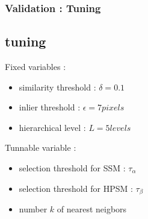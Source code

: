 \documentclass[11pt]{beamer}
\begin{document}
\begin{frame}
\frametitle{Validation : Tuning}
\subsection{tuning}
Fixed variables :
\begin{itemize}
\item similarity threshold : $\delta = 0.1$
\item inlier threshold : $\epsilon = 7 pixels$
\item hierarchical level : $L = 5 levels$
\end{itemize}

Tunnable variable :
\begin{itemize}
\item selection threshold for SSM : $\tau_\alpha$
\item selection threshold for HPSM : $\tau_\beta$
\item number $k$ of nearest neigbors
\end{itemize}

\end{frame}
\end{document}
